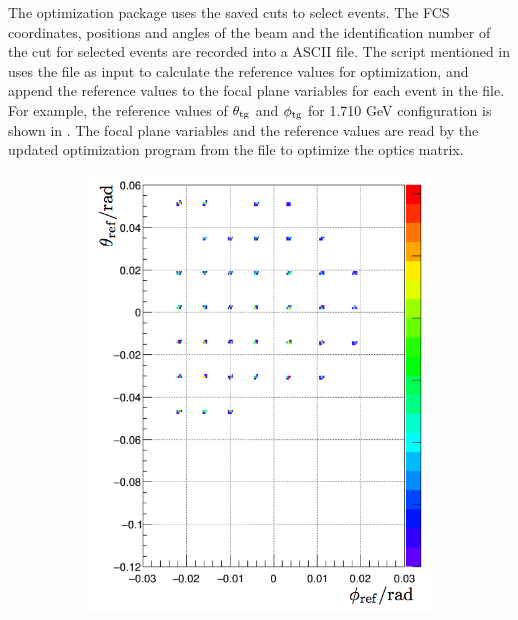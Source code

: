 The optimization package uses the saved cuts to select events. The FCS coordinates, positions and angles of the beam and the identification number of the cut for selected events are recorded into a ASCII file. The script mentioned in  uses the file as input to calculate the reference values for optimization, and append the reference values to the focal plane variables for each event in the file. For example, the reference values of $\theta_{\mathrm{tg}}$ and $\phi_{\mathrm{tg}}$ for 1.710 GeV configuration is shown in . The focal plane variables and the reference values are read by the updated optimization program from the file to optimize the optics matrix.

\begin{figure}[tb!]
  \centering
  \begin{subfigure}[t]{0.45\textwidth}
    \includegraphics[width=\textwidth]{figs/reference-angle-simulation.png}
  \end{subfigure}
  \begin{subfigure}[t]{0.45\textwidth}

\end{subfigure}
\end{figure}
